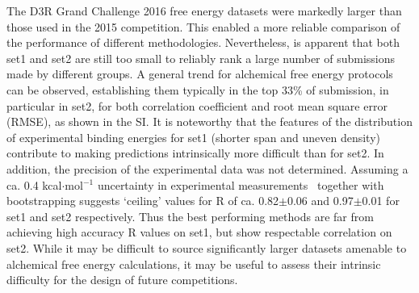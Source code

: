\documentclass{svjour3}                     %
\begin{document}
The D3R Grand Challenge 2016 free energy datasets were markedly larger than those used in the 2015 competition. This enabled a more reliable comparison of the performance of different methodologies. Nevertheless, is apparent that both set1 and set2 are still too small to reliably rank a large number of submissions made by different groups. A general trend for alchemical free energy protocols can be observed, establishing them typically in the top 33\% of submission, in particular in set2, for both correlation coefficient and root mean square error (RMSE), as shown in the SI. It is noteworthy that the features of the distribution of experimental binding energies for set1 (shorter span and uneven density) contribute to making predictions intrinsically more difficult than for set2. In addition, the precision of the experimental data was not determined. Assuming a ca. 0.4 kcal$\cdot$mol$^{-1}$ uncertainty in experimental measurements~\cite{BrownMuchmoreHajduk2009} together with bootstrapping suggests ‘ceiling’ values for R of ca. 0.82$\pm$0.06 and 0.97$\pm$0.01 for set1 and set2 respectively.  Thus the best performing methods are far from achieving high accuracy R values on set1, but show respectable correlation on set2. While it may be difficult to source significantly larger datasets amenable to alchemical free energy calculations, it may be useful to assess their intrinsic difficulty for the design of future competitions.
\end{document}
